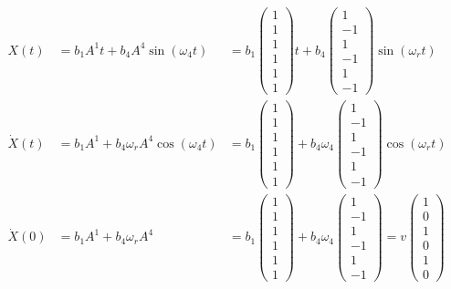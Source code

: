\documentclass[twoside,10pt]{amsart}
\begin{document}
\begin{enumerate}
\[
\begin{gathered}
\begin{aligned}
  X(t) & = b_1 A^1 t + b_4 A^4 \sin{(\omega_4 t) } & = b_1 \left( \begin{matrix} 1 \\ 1 \\ 1 \\ 1 \\ 1 \\ 1 \end{matrix} \right) t + b_4 \left( \begin{matrix} 1 \\ -1 \\ 1 \\ -1 \\ 1 \\ -1 \end{matrix} \right)\sin{(\omega_r t)} \\
  \dot{X}(t) & = b_1 A^1  + b_4 \omega_r A^4 \cos{(\omega_4 t) } & = b_1 \left( \begin{matrix} 1 \\ 1 \\ 1 \\ 1 \\ 1 \\ 1 \end{matrix} \right)  + b_4 \omega_4 \left( \begin{matrix} 1 \\ -1 \\ 1 \\ -1 \\ 1 \\ -1 \end{matrix} \right)\cos{(\omega_r t)} \\
  \dot{X}(0) & = b_1 A^1  + b_4 \omega_r A^4  & = b_1 \left( \begin{matrix} 1 \\ 1 \\ 1 \\ 1 \\ 1 \\ 1 \end{matrix} \right)  + b_4 \omega_4 \left( \begin{matrix} 1 \\ -1 \\ 1 \\ -1 \\ 1 \\ -1 \end{matrix} \right) = v \left( \begin{matrix} 1 \\ 0 \\ 1 \\ 0 \\ 1 \\ 0 \end{matrix} \right)  

\end{aligned}
\end{gathered}\]
\end{enumerate}
\end{document}
